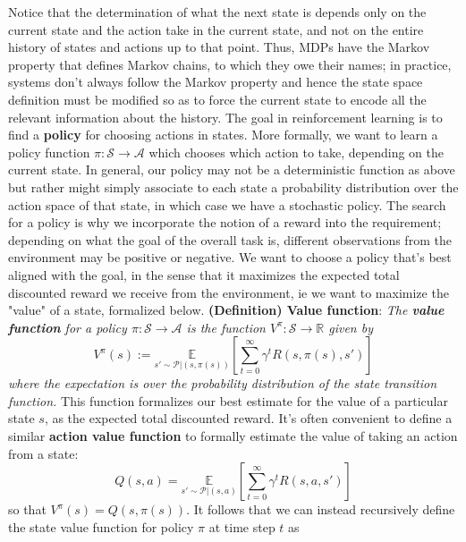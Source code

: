 \documentclass{article}
\begin{document}
Notice that the determination of what the next state is depends only on the current state and the action take in the current state, and not on the entire history of states and actions up to that point. Thus, MDPs have the Markov property that defines Markov chains, to which they owe their names; in practice, systems don't always follow the Markov property and hence the state space definition must be modified so as to force the current state to encode all the relevant information about the history. The goal in reinforcement learning is to find a \textbf{policy} for choosing actions in states. More formally, we want to learn a policy function $ \pi: \mathcal{S} \rightarrow \mathcal{A} $ which chooses which action to take, depending on the current state. In general, our policy may not be a deterministic function as above but rather might simply associate to each state a probability distribution over the action space of that state, in which case we have a stochastic policy. The search for a policy is why we incorporate the notion of a reward into the requirement; depending on what the goal of the overall task is, different observations from the environment may be positive or negative. We want to choose a policy that's best aligned with the goal, in the sense that it maximizes the expected total discounted reward we receive from the environment, ie we want to maximize the "value" of a state, formalized below.
\newline \newline
\textbf{(Definition) Value function}: \textit{The \textbf{value function} for a policy $ \pi: \mathcal{S} \rightarrow \mathcal{A} $ is the function $ V^\pi: \mathcal{S} \rightarrow \mathbb{R} $ given by}
    $$ V^\pi(s) := \underset{s' \sim \mathcal{P} | (s, \pi(s))}{\mathbb{E}} \left[ \sum_{t = 0}^\infty \gamma^t R(s, \pi(s), s') \right] $$
\textit{where the expectation is over the probability distribution of the state transition function.}
\newline \newline
This function formalizes our best estimate for the value of a particular state $ s $, as the expected total discounted reward. It's often convenient to define a similar \textbf{action value function} to formally estimate the value of taking an action from a state:
    $$ Q(s, a) = \underset{s' \sim \mathcal{P} | (s, a)}{\mathbb{E}} \left[ \sum_{t = 0}^\infty \gamma^t R(s, a, s') \right] $$
so that $ V^\pi(s) = Q(s, \pi(s)) $. It follows that we can instead recursively define the state value function for policy $ \pi $ at time step $ t $ as
\end{document}
